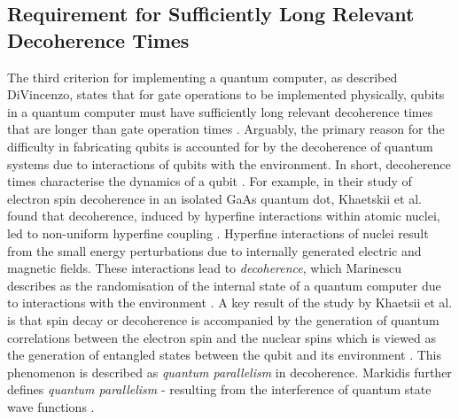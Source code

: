 \subsection{Requirement for Sufficiently Long Relevant Decoherence Times}

The third criterion for implementing a quantum computer, as described DiVincenzo, states that for gate operations to be implemented physically, qubits in a quantum computer must have sufficiently long relevant decoherence times that are longer than gate operation times \cite{divincenzo2000physical}. Arguably, the primary reason for the difficulty in fabricating qubits is accounted for by the decoherence of quantum systems due to interactions of qubits with the environment. In short, decoherence times characterise the dynamics of a qubit \cite{divincenzo2000physical}. For example, in their study of electron spin decoherence in an isolated GaAs quantum dot, Khaetskii et al. found that decoherence, induced by hyperfine interactions within atomic nuclei, led to non-uniform hyperfine coupling \cite{khaetskii2002electron}. Hyperfine interactions of nuclei result from the small energy perturbations due to internally generated electric and magnetic fields. These interactions lead to \textit{decoherence}, which Marinescu describes as the randomisation of the internal state of a quantum computer due to interactions with the environment \cite{marinescu2005promise}. A key result of the study by Khaetsii et al. is that spin decay or decoherence is accompanied by the generation of quantum correlations between the electron spin and the nuclear spins which is viewed as the generation of entangled states between the qubit and its environment \cite{khaetskii2002electron}. This phenomenon is described as \textit{quantum parallelism} in decoherence. Markidis further defines \textit{quantum parallelism} - resulting from the interference of quantum state wave functions \cite{markidis2024quantum}. 

